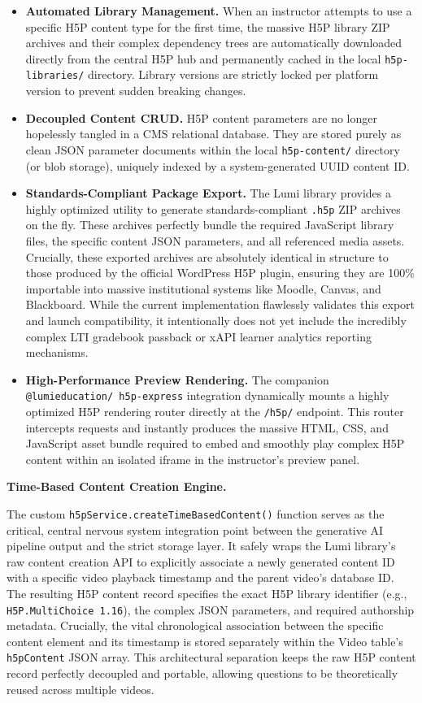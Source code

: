 \begin{itemize}
  \item \textbf{Automated Library Management.} When an instructor attempts to use a specific H5P content type for the first time, the massive H5P library ZIP archives and their complex dependency trees are automatically downloaded directly from the central H5P hub and permanently cached in the local \texttt{h5p-libraries/} directory. Library versions are strictly locked per platform version to prevent sudden breaking changes.
  \item \textbf{Decoupled Content CRUD.} H5P content parameters are no longer hopelessly tangled in a CMS relational database. They are stored purely as clean JSON parameter documents within the local \texttt{h5p-content/} directory (or blob storage), uniquely indexed by a system-generated UUID content ID.
  \item \textbf{Standards-Compliant Package Export.} The Lumi library provides a highly optimized utility to generate standards-compliant \texttt{.h5p} ZIP archives on the fly. These archives perfectly bundle the required JavaScript library files, the specific content JSON parameters, and all referenced media assets. Crucially, these exported archives are absolutely identical in structure to those produced by the official WordPress H5P plugin, ensuring they are 100\% importable into massive institutional systems like Moodle, Canvas, and Blackboard. While the current implementation flawlessly validates this export and launch compatibility, it intentionally does not yet include the incredibly complex LTI gradebook passback or xAPI learner analytics reporting mechanisms.
  \item \textbf{High-Performance Preview Rendering.} The companion \texttt{@lumieducation/ h5p-express} integration dynamically mounts a highly optimized H5P rendering router directly at the \texttt{/h5p/} endpoint. This router intercepts requests and instantly produces the massive HTML, CSS, and JavaScript asset bundle required to embed and smoothly play complex H5P content within an isolated iframe in the instructor's preview panel.
\end{itemize}

\textbf{Time-Based Content Creation Engine.}

The custom \texttt{h5pService.createTimeBasedContent()} function serves as the critical, central nervous system integration point between the generative AI pipeline output and the strict storage layer. It safely wraps the Lumi library's raw content creation API to explicitly associate a newly generated content ID with a specific video playback timestamp and the parent video's database ID. The resulting H5P content record specifies the exact H5P library identifier (e.g., \texttt{H5P.MultiChoice 1.16}), the complex JSON parameters, and required authorship metadata. Crucially, the vital chronological association between the specific content element and its timestamp is stored separately within the Video table's \texttt{h5pContent} JSON array. This architectural separation keeps the raw H5P content record perfectly decoupled and portable, allowing questions to be theoretically reused across multiple videos.

